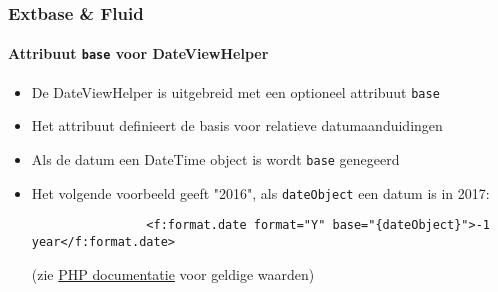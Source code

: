 \begin{frame}[fragile]
	\frametitle{Extbase \& Fluid}
	\framesubtitle{Attribuut \texttt{base} voor DateViewHelper}


	\begin{itemize}

		\item De DateViewHelper is uitgebreid met een optioneel attribuut \texttt{base}
		\item Het attribuut definieert de basis voor relatieve datumaanduidingen
		\item Als de datum een DateTime object is wordt \texttt{base} genegeerd
		\item Het volgende voorbeeld geeft "2016", als \texttt{dateObject} een datum is in 2017:

			\begin{lstlisting}
				<f:format.date format="Y" base="{dateObject}">-1 year</f:format.date>
			\end{lstlisting}

		\small
			(zie \href{http://www.php.net/manual/en/datetime.formats.relative.php}{PHP documentatie} voor geldige waarden)
		\normalsize

	\end{itemize}

\end{frame}


